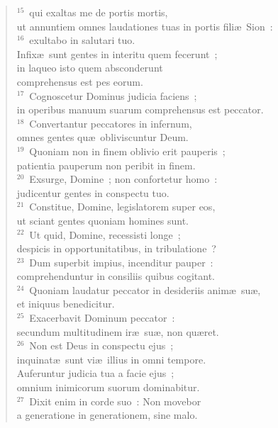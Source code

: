 \begin{flushleft}
\begin{verse}
${}^{15}$~qui exaltas me de portis mortis,\\ ut annuntiem omnes laudationes tuas in portis fili\ae\ Sion~:\\
${}^{16}$~exultabo in salutari tuo.\\ Infix\ae\ sunt gentes in interitu quem fecerunt~;\\ in laqueo isto quem absconderunt\\ comprehensus est pes eorum.\\
${}^{17}$~Cognoscetur Dominus judicia faciens~;\\ in operibus manuum suarum comprehensus est peccator.\\
${}^{18}$~Convertantur peccatores in infernum,\\ omnes gentes qu\ae\ obliviscuntur Deum.\\
${}^{19}$~Quoniam non in finem oblivio erit pauperis~;\\ patientia pauperum non peribit in finem.\\
${}^{20}$~Exsurge, Domine~; non confortetur homo~:\\ judicentur gentes in conspectu tuo.\\
${}^{21}$~Constitue, Domine, legislatorem super eos,\\ ut sciant gentes quoniam homines sunt.\\
${}^{22}$~Ut quid, Domine, recessisti longe~;\\ despicis in opportunitatibus, in tribulatione~?\\
${}^{23}$~Dum superbit impius, incenditur pauper~:\\ comprehenduntur in consiliis quibus cogitant.\\
${}^{24}$~Quoniam laudatur peccator in desideriis anim\ae\ su\ae ,\\ et iniquus benedicitur.\\
${}^{25}$~Exacerbavit Dominum peccator~:\\ secundum multitudinem ir\ae\ su\ae , non qu\ae ret.\\
${}^{26}$~Non est Deus in conspectu ejus~;\\ inquinat\ae\ sunt vi\ae\ illius in omni tempore.\\ Auferuntur judicia tua a facie ejus~;\\ omnium inimicorum suorum dominabitur.\\
${}^{27}$~Dixit enim in corde suo~: Non movebor\\ a generatione in generationem, sine malo.\\

\end{verse}
\end{flushleft}
